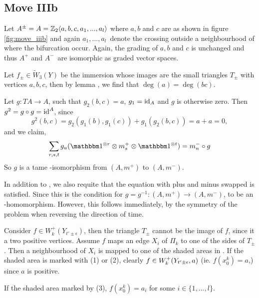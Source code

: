 
\subsection{Move IIIb}
Let $A^\pm = A = \mathbb{Z}_2\langle a,b,c, a_1, ..., a_l \rangle$ where $a,b$ and $c$ are as shown in
figure \ref{fig:move_iiib} and again $a_1,...,a_l$ denote the crossing outside a
neighbourhood of where the bifurcation occur. Again, the grading of
$a,b$ and $c$ is unchanged and thus $A^+$ and $A^-$ are isomorphic as graded
vector spaces.


Let $f_\pm \in \tilde{W}_3(Y)$ be the immersion whose images are the small
triangles $T_\pm$ with vertices $a,b,c$, then by lemma
, we find that $\deg(a) = \deg(bc)$.

Let $g: TA \to A$, such that $g_2(b,c) = a$, $g_1 = \operatorname{id}_A$
and $g$ is otherwise zero. Then $g^2 = g \circ g = \operatorname{id}^A$, since 
\[ g^2(b,c) = g_2(g_1(b),g_1(c)) + g_1(g_2(b,c)) = a+a = 0, \]
and we claim, 
\begin{equation}
\label{eq:move_iii_a_inf_rel}
\sum_{r,s,t} g_u(\I^{\otimes r} \otimes m^+_s \otimes \I^{\otimes t}) 
= m^-_n \circ g 
\end{equation}
So $g$ is a tame \Ainf-isomorphism from $(A, m^+)$ to $(A,m^-)$.

\begin{remark}
In addition to , we also requite that the equation
with plus and minus swapped is satisfied. Since this is the condition for $g =
g^{-1}: (A, m^+) \to (A,m^-)$, to be an \Ainf-homomorphism. 
However, this follows immediately, by the symmetry of the problem when
reversing the direction of time.
\end{remark}

\lskip
Consider $f \in W^+_k(Y_{t'\pm \epsilon})$, then the triangle $T_\pm$ cannot be
the image of $f$, since it a two positive vertices. Assume $f$ maps an edge
$X_i$ of $\Pi_k$ to one of the sides of $T_\pm$. Then a
neighbourhood of $X_i$ is mapped to one of the shaded areas in
. If the shaded area is marked with (1) or (2), clearly $f
\in W^+_k(Y_{t'\pm\epsilon},a)$ (ie. $f(x^k_0) = a$,) since $a$ is positive. 

\begin{lemma}
If the shaded area marked by (3), $f(x^k_0) = a_i$ for some $i \in
\{1,...,l\}$.
\end{lemma}

